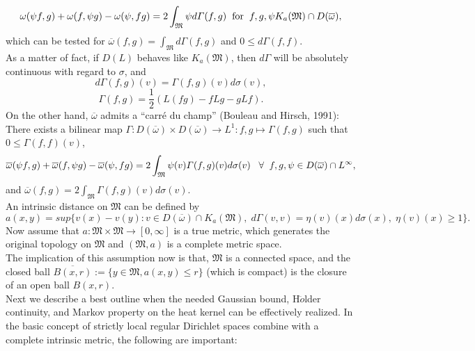 \documentclass[10pt]{article}
\theoremstyle{definition}
\numberwithin{equation}{section}
\begin{document}
	$$ \omega (\psi f,g) + \omega (f, \psi g) - \omega (\psi, fg) = 2 \int_{\mathfrak{M}} \psi d \varGamma (f,g) \hspace{0.2 cm} \mbox{for} \hspace{0.2 cm} f,g,\psi K_a (\mathfrak{M}) \cap D (\overline{\omega}),$$
	which can be tested for $ \overline{\omega} (f,g) = \int_{\mathfrak{M}} d  \varGamma (f,g)$ and $ 0 \leq d \varGamma (f,f)$. \\
	As a matter of fact, if $D(L)$ behaves like $ K_a (\mathfrak{M})$, then $d \varGamma$ will be absolutely continuous with regard to $ \sigma $, and
	$$ d \varGamma(f,g)(v) = \varGamma (f,g)(v)d \sigma (v),$$
	$$ \varGamma(f,g) = \frac{1}{2} (L(fg)-fLg - gLf).$$
	On the other hand, $ \overline{\omega}$ admits a “carré du champ” (Bouleau and Hirsch, 1991): There exists a bilinear map $\varGamma: D(\overline{\omega}) \times D(\overline{\omega}) \longrightarrow L^1 : f,g \mapsto \varGamma (f,g)$ such that $ 0\leq\varGamma (f,f) (v)$,
	$$\overline{\omega} (\psi f,g) + \overline{\omega} (f, \psi g) - \overline{\omega} (\psi, fg)
	= 2 \int_{\mathfrak{M}} \psi (v) \varGamma (f,g) (v) d \sigma (v) \hspace{0.3 cm} \forall\;\; f,g,\psi \in D(\overline{\omega}) \cap L^{\infty},$$
	and $ \overline{\omega}(f,g) = 2\int_{\mathfrak{M}} \varGamma (f,g)(v)d\sigma (v)$.\\
	An intrinsic distance on $\mathfrak{M}$ can be defined by
	$$ a(x,y) = sup\{v(x) - v(y) : v\in D(\overline{\omega})\cap K_a (\mathfrak{M}),\; d\varGamma(v,v) = \eta(v)(x)d\sigma(x),\; \eta (v)(x)\geq 1\}.$$
Now assume that $ a : \mathfrak{M} \times \mathfrak{M} \longrightarrow [0,\infty]$ is a true metric, which generates the original topology on $\mathfrak{M}$ and $(\mathfrak{M}, a)$ is a complete metric space.\\
	The implication of this assumption now is that,  $\mathfrak{M}$ is a connected space, and the closed ball $\overline{B(x,r)} := \{ y \in \mathfrak{M},a(x, y) \leq r \}$ (which is compact) is the closure of an open ball $B(x,r)$.\\
	Next we describe a best outline when the needed Gaussian bound, H$\ddot{o}$lder continuity, and Markov property on the heat kernel can be effectively realized. In the basic concept of strictly local regular Dirichlet spaces combine with a complete intrinsic metric, the following are important:\\
\end{document}
